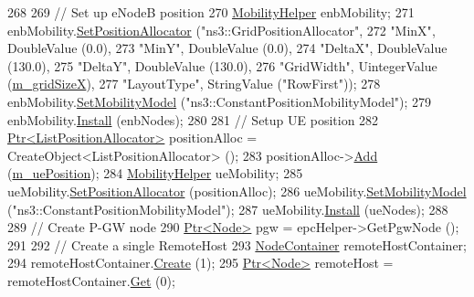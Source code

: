 \begin{DoxyCode}
268 
269   \textcolor{comment}{// Set up eNodeB position}
270   \hyperlink{classns3_1_1MobilityHelper}{MobilityHelper} enbMobility;
271   enbMobility.\hyperlink{classns3_1_1MobilityHelper_ac59d5295076be3cc11021566713a28c5}{SetPositionAllocator} (\textcolor{stringliteral}{"ns3::GridPositionAllocator"},
272                                     \textcolor{stringliteral}{"MinX"}, DoubleValue (0.0),
273                                     \textcolor{stringliteral}{"MinY"}, DoubleValue (0.0),
274                                     \textcolor{stringliteral}{"DeltaX"}, DoubleValue (130.0),
275                                     \textcolor{stringliteral}{"DeltaY"}, DoubleValue (130.0),
276                                     \textcolor{stringliteral}{"GridWidth"}, UintegerValue (\hyperlink{classLteHandoverTargetTestCase_ad4b214cbc0eba746b7f87d8de07c5cce}{m\_gridSizeX}),
277                                     \textcolor{stringliteral}{"LayoutType"}, StringValue (\textcolor{stringliteral}{"RowFirst"}));
278   enbMobility.\hyperlink{classns3_1_1MobilityHelper_a030275011b6f40682e70534d30280aba}{SetMobilityModel} (\textcolor{stringliteral}{"ns3::ConstantPositionMobilityModel"});
279   enbMobility.\hyperlink{classns3_1_1MobilityHelper_a07737960ee95c0777109cf2994dd97ae}{Install} (enbNodes);
280 
281   \textcolor{comment}{// Setup UE position}
282   \hyperlink{classns3_1_1Ptr}{Ptr<ListPositionAllocator>} positionAlloc = CreateObject<ListPositionAllocator> 
      ();
283   positionAlloc->\hyperlink{classns3_1_1ListPositionAllocator_a460e82f015ac012a73ba0ea0cccb3486}{Add} (\hyperlink{classLteHandoverTargetTestCase_aba4c81ee775bfd5ea7731bd9663b4d58}{m\_uePosition});
284   \hyperlink{classns3_1_1MobilityHelper}{MobilityHelper} ueMobility;
285   ueMobility.\hyperlink{classns3_1_1MobilityHelper_ac59d5295076be3cc11021566713a28c5}{SetPositionAllocator} (positionAlloc);
286   ueMobility.\hyperlink{classns3_1_1MobilityHelper_a030275011b6f40682e70534d30280aba}{SetMobilityModel} (\textcolor{stringliteral}{"ns3::ConstantPositionMobilityModel"});
287   ueMobility.\hyperlink{classns3_1_1MobilityHelper_a07737960ee95c0777109cf2994dd97ae}{Install} (ueNodes);
288 
289   \textcolor{comment}{// Create P-GW node}
290   \hyperlink{classns3_1_1Ptr}{Ptr<Node>} pgw = epcHelper->GetPgwNode ();
291 
292   \textcolor{comment}{// Create a single RemoteHost}
293   \hyperlink{classns3_1_1NodeContainer}{NodeContainer} remoteHostContainer;
294   remoteHostContainer.\hyperlink{classns3_1_1NodeContainer_a787f059e2813e8b951cc6914d11dfe69}{Create} (1);
295   \hyperlink{classns3_1_1Ptr}{Ptr<Node>} remoteHost = remoteHostContainer.\hyperlink{classns3_1_1NodeContainer_a9ed96e2ecc22e0f5a3d4842eb9bf90bf}{Get} (0);

\end{DoxyCode}
